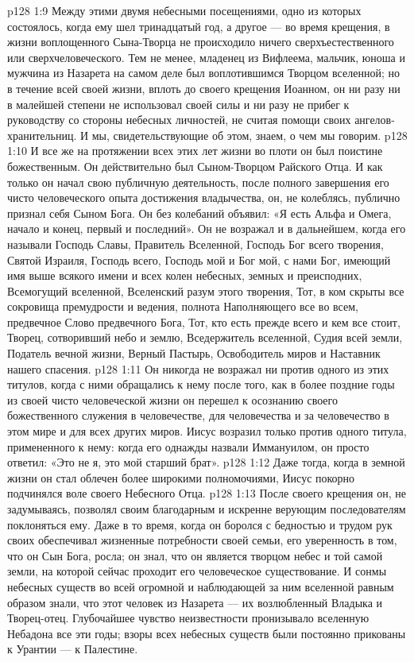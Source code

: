 \vs p128 1:9 Между этими двумя небесными посещениями, одно из которых состоялось, когда ему шел тринадцатый год, а другое --- во время крещения, в жизни воплощенного Сына\hyp{}Творца не происходило ничего сверхъестественного или сверхчеловеческого. Тем не менее, младенец из Вифлеема, мальчик, юноша и мужчина из Назарета на самом деле был воплотившимся Творцом вселенной; но в течение всей своей жизни, вплоть до своего крещения Иоанном, он ни разу ни в малейшей степени не использовал своей силы и ни разу не прибег к руководству со стороны небесных личностей, не считая помощи своих ангелов\hyp{}хранительниц. И мы, свидетельствующие об этом, знаем, о чем мы говорим.
\vs p128 1:10 И все же на протяжении всех этих лет жизни во плоти он был поистине божественным. Он действительно был Сыном\hyp{}Творцом Райского Отца. И как только он начал свою публичную деятельность, после полного завершения его чисто человеческого опыта достижения владычества, он, не колеблясь, публично признал себя Сыном Бога. Он без колебаний объявил: «Я есть Альфа и Омега, начало и конец, первый и последний». Он не возражал и в дальнейшем, когда его называли Господь Славы, Правитель Вселенной, Господь Бог всего творения, Святой Израиля, Господь всего, Господь мой и Бог мой, с нами Бог, имеющий имя выше всякого имени и всех колен небесных, земных и преисподних, Всемогущий вселенной, Вселенский разум этого творения, Тот, в ком скрыты все сокровища премудрости и ведения, полнота Наполняющего все во всем, предвечное Слово предвечного Бога, Тот, кто есть прежде всего и кем все стоит, Творец, сотворивший небо и землю, Вседержитель вселенной, Судия всей земли, Податель вечной жизни, Верный Пастырь, Освободитель миров и Наставник нашего спасения.
\vs p128 1:11 \pc Он никогда не возражал ни против одного из этих титулов, когда с ними обращались к нему после того, как в более поздние годы из своей чисто человеческой жизни он перешел к осознанию своего божественного служения в человечестве, для человечества и за человечество в этом мире и для всех других миров. Иисус возразил только против одного титула, примененного к нему: когда его однажды назвали Иммануилом, он просто ответил: «Это не я, это мой старший брат».
\vs p128 1:12 Даже тогда, когда в земной жизни он стал облечен более широкими полномочиями, Иисус покорно подчинялся воле своего Небесного Отца.
\vs p128 1:13 После своего крещения он, не задумываясь, позволял своим благодарным и искренне верующим последователям поклоняться ему. Даже в то время, когда он боролся с бедностью и трудом рук своих обеспечивал жизненные потребности своей семьи, его уверенность в том, что он Сын Бога, росла; он знал, что он является творцом небес и той самой земли, на которой сейчас проходит его человеческое существование. И сонмы небесных существ во всей огромной и наблюдающей за ним вселенной равным образом знали, что этот человек из Назарета --- их возлюбленный Владыка и Творец\hyp{}отец. Глубочайшее чувство неизвестности пронизывало вселенную Небадона все эти годы; взоры всех небесных существ были постоянно прикованы к Урантии --- к Палестине.
